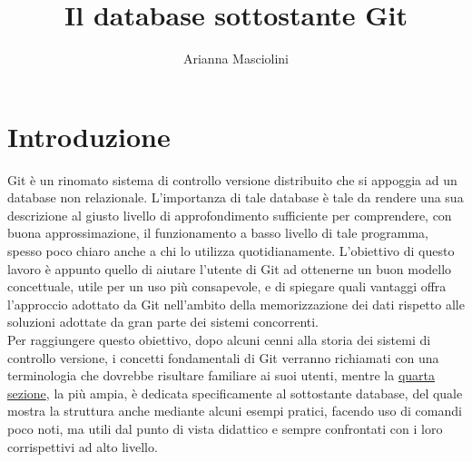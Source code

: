 \documentclass[12pt]{article}
\title{Il database sottostante Git}
\author{Arianna Masciolini}
\begin{document}
\maketitle
\newpage
\tableofcontents
\newpage
\section{Introduzione}
Git è un rinomato sistema di controllo versione distribuito che si appoggia ad un database non relazionale. L'importanza di tale database è tale da rendere una sua descrizione al giusto livello di approfondimento sufficiente per comprendere, con buona approssimazione, il funzionamento a basso livello di tale programma, spesso poco chiaro anche a chi lo utilizza quotidianamente. 
L'obiettivo di questo lavoro è appunto quello di aiutare l'utente di Git ad ottenerne un buon modello concettuale, utile per un uso più consapevole, e di spiegare quali vantaggi offra l'approccio adottato da Git nell'ambito della memorizzazione dei dati rispetto alle soluzioni adottate da gran parte dei sistemi concorrenti. 
\bigskip \\
Per raggiungere questo obiettivo, dopo alcuni cenni alla storia dei sistemi di controllo versione, i concetti fondamentali di Git verranno richiamati con una terminologia che dovrebbe risultare familiare ai suoi utenti, mentre la \hyperref[quarta sezione]{quarta sezione}, la più ampia, è dedicata specificamente al sottostante database, del quale mostra la struttura anche mediante alcuni esempi pratici, facendo uso di comandi poco noti, ma utili dal punto di vista didattico e sempre confrontati con i loro corrispettivi ad alto livello.
\end{document}
